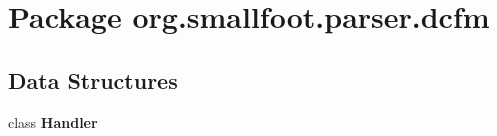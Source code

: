 \section{Package org.\+smallfoot.\+parser.\+dcfm}
\label{namespaceorg_1_1smallfoot_1_1parser_1_1dcfm}
\subsection*{Data Structures}
\begin{DoxyCompactItemize}
\item 
class {\bf Handler}
\end{DoxyCompactItemize}
